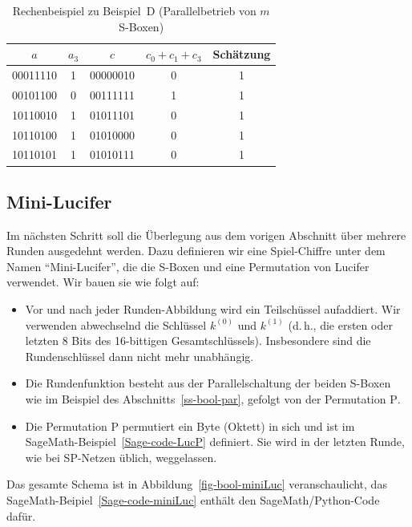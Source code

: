 \begin{refsegment}
\begin{table}
\begin{center}
\begin{tabular}{|c|c|c|c|c|} \hline
     $a$   & $a_3$ &    $c$   & $c_0 + c_1 + c_3$ & Schätzung \\ \hline
  00011110 &   1   & 00000010 &         0         &     1     \\
  00101100 &   0   & 00111111 &         1         &     1     \\
  10110010 &   1   & 01011101 &         0         &     1     \\
  10110100 &   1   & 01010000 &         0         &     1     \\
  10110101 &   1   & 01010111 &         0         &     1     \\ \hline
\end{tabular}
\end{center}
\caption{Rechenbeispiel zu Beispiel~D (Parallelbetrieb von $m$ S-Boxen)}\label{tab-bool-BspC}
\end{table}



\subsection{Mini-Lucifer}\label{ss-bool-mini}

Im nächsten Schritt soll die Überlegung aus dem vorigen Abschnitt über
mehrere Runden ausgedehnt werden. Dazu definieren wir eine Spiel-Chiffre
unter dem Namen "`Mini-Lucifer"', die die S-Boxen
und eine Permutation von Lucifer verwendet. Wir bauen
sie wie folgt auf:
\begin{itemize}
   \item Vor und nach jeder Runden-Abbildung wird ein Teilschüssel
      aufaddiert. Wir verwenden abwechselnd die Schlüssel $k^{(0)}$ und $k^{(1)}$
      (d.\,h., die ersten oder letzten 8 Bits des 16-bittigen Gesamtschlüssels).
      Insbesondere sind die Rundenschlüssel dann
      nicht mehr unabhängig.
   \item Die Rundenfunktion besteht aus der Parallelschaltung der beiden
      S-Boxen wie im Beispiel des Abschnitts~\ref{ss-bool-par}, gefolgt
      von der Permutation $\textrm{P}$.
   \item Die Permutation $\textrm{P}$ permutiert ein Byte (Oktett) in sich und
      ist im SageMath-Beispiel~\ref{Sage-code-LucP} definiert. Sie wird in der
      letzten Runde, wie bei SP-Netzen üblich, weggelassen.
\end{itemize}
Das gesamte Schema ist in Abbildung~\ref{fig-bool-miniLuc} veranschaulicht,
das SageMath-Beipiel~\ref{Sage-code-miniLuc} enthält den SageMath/Python-Code dafür.


\end{refsegment}
